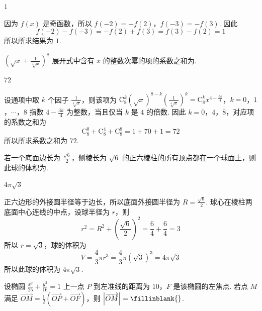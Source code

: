 \begin{answer}
\(1\)
\end{answer}

\begin{solution}
因为 \(f(x)\) 是奇函数，所以 \(f(-2)=-f(2)\)，\(f(-3)=-f(3)\). 因此
\[
f(-2)-f(-3)=-f(2)+f(3)=f(3)-f(2)=1
\]
所以所求结果为 \(1\).
\end{solution}

\begin{problem}
\(\left(\sqrt{x}+\frac{1}{\sqrt[4]{x}}\right)^8\) 展开式中含有 \(x\) 的整数次幂的项的系数之和为\fillinblank{}.
\end{problem}

\begin{answer}
\(72\)
\end{answer}

\begin{solution}
设通项中取 \(k\) 个因子 \(\frac{1}{\sqrt[4]{x}}\)，则该项为
\(\mathrm C_8^k\left(\sqrt{x}\right)^{8-k}\left(\frac{1}{\sqrt[4]{x}}\right)^k =\mathrm C_8^k x^{4-\frac{3k}{4}}\)，\(k=0\)，\(1\)，\(\cdots\)，\(8\)
指数 \(4-\frac{3k}{4}\) 为整数，当且仅当 \(k\) 是 \(4\) 的倍数. 因此 \(k=0\)，\(4\)，\(8\)，对应项的系数之和为
\[
\mathrm C_8^0+\mathrm C_8^4+\mathrm C_8^8=1+70+1=72
\]
所以所求系数之和为 \(72\).
\end{solution}

\begin{problem}
若一个底面边长为 \(\frac{\sqrt{6}}{2}\)，侧棱长为 \(\sqrt{6}\) 的正六棱柱的所有顶点都在一个球面上，则此球的体积为\fillinblank{}.
\end{problem}

\begin{answer}
\(4\pi\sqrt{3}\)
\end{answer}

\begin{solution}
正六边形的外接圆半径等于边长，所以底面外接圆半径为 \(R=\frac{\sqrt{6}}{2}\). 球心在棱柱两底面中心连线的中点，设球半径为 \(r\)，则
\[
r^2=R^2+\left(\frac{\sqrt{6}}{2}\right)^2
=\frac{6}{4}+\frac{6}{4}=3
\]
所以 \(r=\sqrt{3}\)，球的体积为
\[
V=\frac{4}{3}\pi r^3=\frac{4}{3}\pi\left(\sqrt{3}\right)^3=4\pi\sqrt{3}
\]
所以此球的体积为 \(4\pi\sqrt{3}\).
\end{solution}

\begin{problem}
设椭圆 \(\frac{x^2}{25}+\frac{y^2}{16}=1\) 上一点 \(P\) 到左准线的距离为 \(10\)，\(F\) 是该椭圆的左焦点. 若点 \(M\) 满足 \(\overrightarrow{OM}=\frac{1}{2}\left(\overrightarrow{OP}+\overrightarrow{OF}\right)\)，则 \(\left|\overrightarrow{OM}\right|=\fillinblank{}\).
\end{problem}

